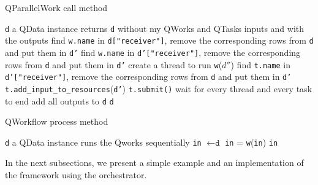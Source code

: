 \documentclass[10pt, conference, compsocconf]{IEEEtran}
\begin{document}
\begin{algorithm}
\caption{QParallelWork call method}
\label{alg:Qparallel}
\begin{algorithmic}
\REQUIRE \texttt{d} a QData instance
\ENSURE returns \texttt{d} without my QWorks and QTasks inputs and with the outputs
\STATE find \texttt{w.name} in \texttt{d["receiver"]}, remove the corresponding rows from \texttt{d} and put them in \texttt{d'}
\ENDFOR
{}
\STATE find \texttt{w.name} in \texttt{d'["receiver"]}, remove the corresponding rows from \texttt{d} and put them in \texttt{d'}
\STATE create a thread to run \texttt{w}($d''$)
\ENDFOR
{}
\STATE find \texttt{t.name} in \texttt{d'["receiver"]}, remove the corresponding rows from \texttt{d} and put them in \texttt{d'}
\STATE \texttt{t.add\_input\_to\_resources}(\texttt{d'})
\STATE \texttt{t.submit()}
\ENDFOR
\STATE wait for every thread and every task to end
\STATE add all outputs to \texttt{d}
\RETURN \texttt{d}
\end{algorithmic}
\end{algorithm}

\begin{algorithm}
\caption{QWorkflow process method}
\label{alg:Qworkflow}
\begin{algorithmic}
\REQUIRE \texttt{d} a QData instance
\ENSURE runs the Qworks sequentially
\STATE \texttt{in} $\leftarrow \texttt{d}$
\STATE \texttt{in} = \texttt{w}(\texttt{in})
\ENDFOR
\RETURN \texttt{in}
\end{algorithmic}
\end{algorithm}

In the next subsections, we present a simple example and an implementation of the framework using the orchestrator.
 
\end{document}
